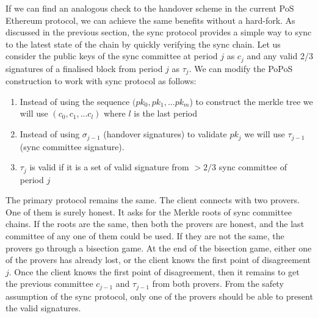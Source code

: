If we can find an analogous check to the handover scheme in the current PoS Ethereum protocol, we can achieve the same benefits without a hard-fork. 
As discussed in the previous section, the sync protocol provides a simple way to sync to the latest state of the chain by quickly verifying the sync chain. 
Let us consider the public keys of the sync committee at period $j$ as $c_j$ and any valid 2/3 signatures of a finalised block from period $j$ as $\tau_j$. 
We can modify the PoPoS construction to work with sync protocol as follows:
\begin{enumerate}
    \item Instead of using the sequence $(pk_0, pk_1, ... pk_m$) to construct the merkle tree we will use $(c_0, c_1, ... c_l)$ where $l$ is the last period
    \item Instead of using $\sigma_{j - 1}$ (handover signatures) to validate $pk_j$ we will use $\tau_{j - 1}$ (sync committee signature).
    \item $\tau_j$ is valid if it is a set of valid signature from $>2/3$ sync committee of period $j$
\end{enumerate}
   
The primary protocol remains the same. 
The client connects with two provers. 
One of them is surely honest. 
It asks for the Merkle roots of sync committee chains. 
If the roots are the same, then both the provers are honest, and the last committee of any one of them could be used. 
If they are not the same, the provers go through a bisection game. 
At the end of the bisection game, either one of the provers has already lost, or the client knows the first point of disagreement $j$. 
Once the client knows the first point of disagreement, then it remains to get the previous committee $c_{j - 1}$ and $\tau_{j - 1}$ from both provers. 
From the safety assumption of the sync protocol, only one of the provers should be able to present the valid signatures.
   
